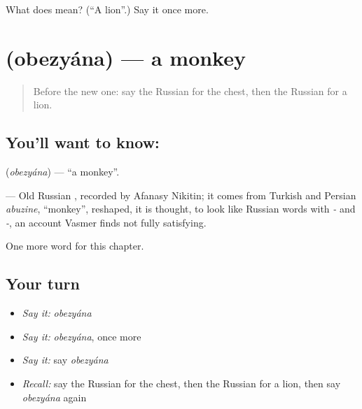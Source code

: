 \begin{tcolorbox}[breakable,colback=teal!4,colframe=teal!35!black,title={Before you move on}]
What does  mean? (\textquotedblleft{}A lion\textquotedblright{}.) Say it once more.
\end{tcolorbox}
\section[\texorpdfstring{\ru{обезьяна} (obezyána)}{обезьяна (obezyána)}]{ (obezyána) — a monkey}

\label{lesson:RU-C120-monkey}



\begin{quote}
Before the new one: say the Russian for the chest, then the Russian for a lion.
\end{quote}

\subsection*{You'll want to know: }
\textbf{} (\emph{obezyána}) — \textquotedblleft{}a monkey\textquotedblright{}.

\begin{cousinweb}
\textbf{} — Old Russian \emph{}, recorded by Afanasy Nikitin; it comes from Turkish and Persian \emph{abuzine}, \textquotedblleft{}monkey\textquotedblright{}, reshaped, it is thought, to look like Russian words with \emph{-} and \emph{-}, an account Vasmer finds not fully satisfying.
\end{cousinweb}

\begin{grammarlens}[title={What you've built}]
One more word for this chapter.
\end{grammarlens}

\subsection*{Your turn}
\begin{itemize}
\raggedright
  \item \emph{Say it:} \emph{obezyána}
  \item \emph{Say it:} \emph{obezyána}, once more
  \item \emph{Say it:} say \emph{obezyána}
  \item \emph{Recall:} say the Russian for the chest, then the Russian for a lion, then say \emph{obezyána} again
\end{itemize}

